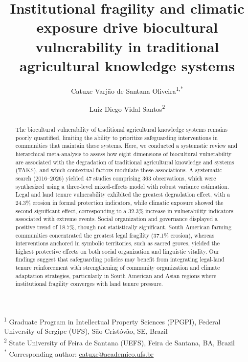 \documentclass[12pt,a4paper]{article}
\begin{document}
\title{Institutional fragility and climatic exposure drive biocultural vulnerability in traditional agricultural knowledge systems}

\author{Catuxe Varj\~ao de Santana Oliveira\textsuperscript{1,*} \and Luiz Diego Vidal Santos\textsuperscript{2}}

\date{}
\maketitle

\noindent\textsuperscript{1} Graduate Program in Intellectual Property Sciences (PPGPI), Federal University of Sergipe (UFS), S\~ao Crist\'ov\~ao, SE, Brazil \\
\textsuperscript{2} State University of Feira de Santana (UEFS), Feira de Santana, BA, Brazil \\
\textsuperscript{*} Corresponding author: \href{mailto:catuxe@academico.ufs.br}{catuxe@academico.ufs.br}

\begin{abstract}
The biocultural vulnerability of traditional agricultural knowledge systems remains poorly quantified, limiting the ability to prioritize safeguarding interventions in communities that maintain these systems. Here, we conducted a systematic review and hierarchical meta-analysis to assess how eight dimensions of biocultural vulnerability are associated with the degradation of traditional agricultural knowledge and systems (TAKS), and which contextual factors modulate these associations. A systematic search (2016--2026) yielded 47 studies comprising 363 observations, which were synthesized using a three-level mixed-effects model with robust variance estimation. Legal and land tenure vulnerability exhibited the greatest degradation effect, with a 24.3\% erosion in formal protection indicators, while climatic exposure showed the second significant effect, corresponding to a 32.3\% increase in vulnerability indicators associated with extreme events. Social organization and governance displayed a positive trend of 18.7\%, though not statistically significant. South American farming communities concentrated the greatest legal fragility (37.1\% erosion), whereas interventions anchored in symbolic territories, such as sacred groves, yielded the highest protective effects on both social organization and linguistic vitality. Our findings suggest that safeguarding policies may benefit from integrating legal-land tenure reinforcement with strengthening of community organization and climate adaptation strategies, particularly in South American and Asian regions where institutional fragility converges with land tenure pressure.
\end{abstract}
\end{document}
